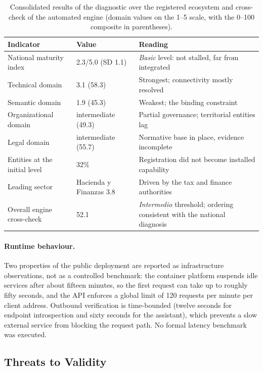 \documentclass[runningheads]{llncs}
\begin{document}
\begin{table}[t]
\caption{Consolidated results of the diagnostic over the registered ecosystem
and cross-check of the automated engine (domain values on the 1--5 scale, with
the 0--100 composite in parentheses).}
\label{tab:results}
\centering
\setlength{\tabcolsep}{4pt}
\footnotesize
\begin{tabular}{p{3.3cm}p{2.4cm}p{5.6cm}}
\toprule
Indicator & Value & Reading \\
\midrule
National maturity index & 2.3/5.0 (SD 1.1) & \emph{Basic} level: not
stalled, far from integrated \\
Technical domain & 3.1 (58.3) & Strongest; connectivity mostly resolved \\
Semantic domain & 1.9 (45.3) & Weakest; the binding constraint \\
Organizational domain & intermediate (49.3) & Partial governance; territorial
entities lag \\
Legal domain & intermediate (55.7) & Normative base in place, evidence
incomplete \\
Entities at the initial level & 32\% & Registration did not become installed
capability \\
Leading sector & Hacienda y Finanzas 3.8 & Driven by the tax and finance
authorities \\
Overall engine cross-check & 52.1 & \emph{Intermedio} threshold; ordering
consistent with the national diagnosis \\
\bottomrule
\end{tabular}
\end{table}

\paragraph{Runtime behaviour.} Two properties of the public deployment are
reported as infrastructure observations, not as a controlled benchmark: the
container platform suspends idle services after about fifteen minutes, so the
first request can take up to roughly fifty seconds, and the API enforces a
global limit of 120 requests per minute per client address. Outbound
verification is time-bounded (twelve seconds for endpoint introspection and
sixty seconds for the assistant), which prevents a slow external service from
blocking the request path. No formal latency benchmark was executed.

\subsection{Threats to Validity}
\label{sec:eval:threats}
\end{document}
